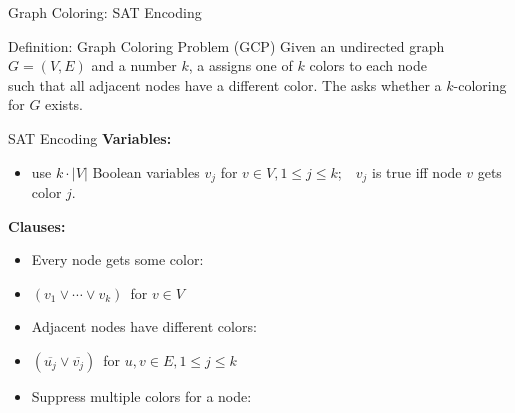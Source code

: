 \documentclass[t]{sdqbeamer}
\begin{document}
\begin{frame}{Graph Coloring: SAT Encoding}
\begin{block}{Definition: Graph Coloring Problem (GCP)}
Given an undirected graph $G=(V,E)$ and a number $k$, a  assigns one of $k$ colors to each node\\
such that all adjacent nodes have a different color. The  asks whether a $k$-coloring for $G$ exists.
\end{block}
\pause
\begin{block}{SAT Encoding}
\textbf{Variables:} 
\begin{itemize}
	\item<3-> use $k \cdot |V|$ Boolean variables $v_j$ for $v \in V, 1 \leq j \leq k$;\ \ $v_j$ is true iff node $v$ gets color $j$.
\end{itemize}
\textbf{Clauses:}
\begin{itemize}\setlength{\itemsep}{.5ex}
	\item<4-> Every node gets some color: 
	\item[]<5-> \quad $(v_1 \lor \cdots \lor v_k)\,$ for $v \in V$
	\item<6-> Adjacent nodes have different colors: 
	\item[]<7-> \quad $(\overline{u_j} \lor \overline{v_j})\,$ for ${u,v} \in E, 1 \leq j \leq k$
	\item<8-> Suppress multiple colors for a node: 
\end{itemize}
\end{block}
\end{frame}
\end{document}
